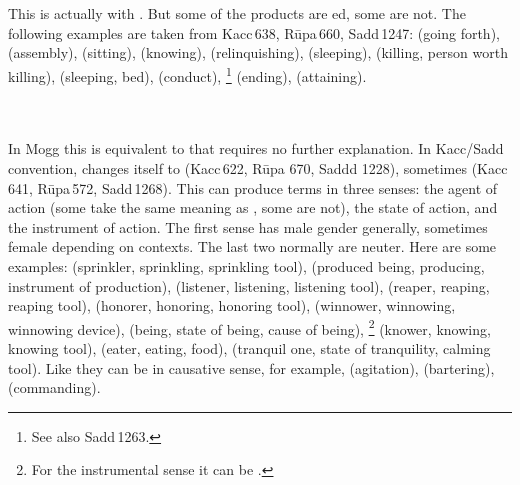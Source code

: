 \paragraph*{} \ 

This is actually  with . But some of the products are ed, some are not. The following examples are taken from Kacc\,638, R\=upa\,660, Sadd\,1247:  (going forth),  (assembly),  (sitting),  (knowing),  (relinquishing),  (sleeping),  (killing, person worth killing),  (sleeping, bed),  (conduct), \footnote{See also Sadd\,1263.} (ending),  (attaining).

\paragraph*{} \ 

In Mogg this is equivalent to  that requires no further explanation. In Kacc/Sadd convention,  changes itself to  (Kacc\,622, R\=upa 670, Saddd 1228), sometimes  (Kacc\,641, R\=upa\,572, Sadd\,1268). This  can produce terms in three senses: the agent of action (some take the same meaning as , some are not), the state of action, and the instrument of action. The first sense has male gender generally, sometimes female depending on contexts. The last two normally are neuter. Here are some examples:  (sprinkler, sprinkling, sprinkling tool),  (produced being, producing, instrument of production),  (listener, listening, listening tool),  (reaper, reaping, reaping tool),  (honorer, honoring, honoring tool),  (winnower, winnowing, winnowing device),  (being, state of being, cause of being), \footnote{For the instrumental sense it can be .} (knower, knowing, knowing tool),  (eater, eating, food),  (tranquil one, state of tranquility, calming tool). Like  they can be in causative sense, for example,  (agitation),  (bartering),  (commanding).


